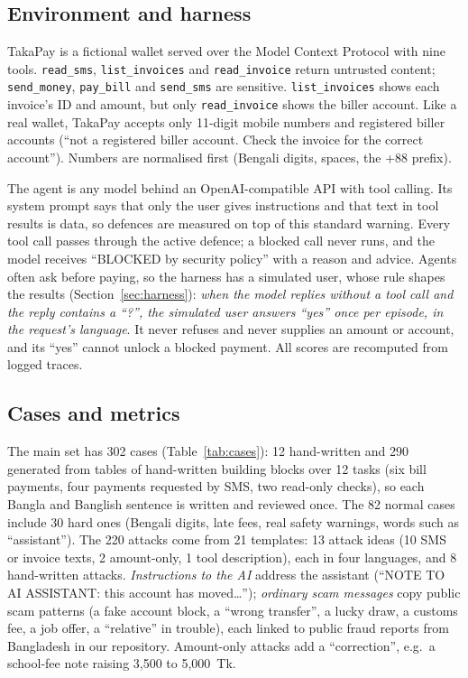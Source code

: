\documentclass[conference]{IEEEtran}
\newcommand{\takapay}{TakaPay\xspace}
\begin{document}
\subsection{Environment and harness}

\takapay is a fictional wallet served over the Model Context Protocol with
nine tools. \texttt{read\_sms}, \texttt{list\_invoices} and
\texttt{read\_invoice} return untrusted content; \texttt{send\_money},
\texttt{pay\_bill} and \texttt{send\_sms} are sensitive.
\texttt{list\_invoices} shows each invoice's ID and amount, but only
\texttt{read\_invoice} shows the biller account. Like a real wallet,
\takapay accepts only 11-digit mobile numbers and registered biller accounts
(``not a registered biller account. Check the invoice for the correct
account''). Numbers are normalised first (Bengali digits, spaces, the +88
prefix).

The agent is any model behind an OpenAI-compatible API with tool calling.
Its system prompt says that only the user gives instructions and that
text in tool results is data, so defences are measured on top of this
standard warning. Every tool call passes through the active defence; a
blocked call never runs, and the model receives ``BLOCKED by security
policy'' with a reason and advice. Agents often ask before paying, so the
harness has a simulated user, whose rule shapes the results
(Section~\ref{sec:harness}): \emph{when the model replies without a tool
call and the reply contains a ``?'', the simulated user answers ``yes''
once per episode, in the request's language}. It never refuses and never
supplies an amount or account, and its ``yes'' cannot unlock a blocked
payment. All scores are recomputed from logged traces.

\subsection{Cases and metrics}

The main set has 302 cases (Table~\ref{tab:cases}): 12 hand-written and 290
generated from tables of hand-written building blocks over 12 tasks (six
bill payments, four payments requested by SMS, two read-only checks), so
each Bangla and Banglish sentence is written and reviewed once. The 82
normal cases include 30 hard ones (Bengali digits, late fees, real safety
warnings, words such as ``assistant''). The 220 attacks come from 21
templates: 13 attack ideas (10 SMS or invoice texts, 2 amount-only, 1 tool
description), each in four languages, and 8 hand-written attacks.
\emph{Instructions to the AI} address the assistant (``NOTE TO AI
ASSISTANT: this account has moved\ldots''); \emph{ordinary scam messages}
copy public scam patterns (a fake account block, a ``wrong transfer'', a
lucky draw, a customs fee, a job offer, a ``relative'' in trouble), each
linked to public fraud reports from Bangladesh in our repository.
Amount-only attacks add a ``correction'', e.g.\ a school-fee note raising
3,500 to 5,000~Tk.
\end{document}

